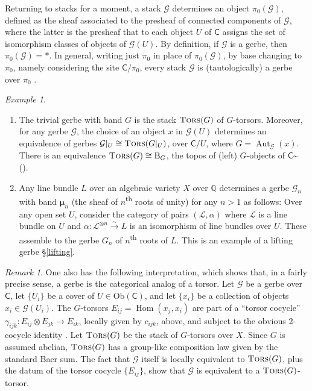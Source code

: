 \documentclass{amsart}
\numberwithin{equation}{subsection}
\theoremstyle{remark}
\newtheorem{example}[theorem]{Example}
\theoremstyle{remark}
\newtheorem*{remark*}{Remark}
\newcommand{\cG}{\mathcal{G}}
\newcommand{\cL}{\mathcal{L}}
\newcommand{\bbQ}{\mathbb{Q}}
\DeclareMathOperator{\Aut}{Aut}
\newcommand{\B}{\mathrm{B}} %
\newcommand{\C}{\mathsf{C}} %
\DeclareMathOperator{\Hom}{Hom}
\newcommand{\iso}{\cong}
\newcommand{\mmu}{\boldsymbol{\mu}} %
\newcommand{\Ob}{\mathrm{Ob}}
\newcommand{\shC}{\C\sptilde} %
\newcommand{\ts}{\textsuperscript}
\DeclareMathOperator{\tors}{\textsc{Tors}} %
\begin{document}
Returning to stacks for a moment, a stack $\cG$ determines an object $\pi_0(\cG)$, defined as the sheaf associated to the presheaf of connected components of $\cG$, where the latter is the presheaf that to each object $U$ of $\C$ assigns the set of isomorphism classes of objects of $\cG(U)$. By definition, if $\cG$ is a gerbe, then $\pi_0(\cG)=*$. In general, writing just $\pi_0$ in place of $\pi_0(\cG)$, by base changing to $\pi_0$, namely considering the site $\C/\pi_0$, every stack $\cG$ is (tautologically) a gerbe over $\pi_0$ \cite{L-MB}.

\begin{example}\hfill
  \begin{enumerate}
  \item The trivial gerbe with band $G$ is the stack $\tors(G)$ of $G$-torsors.  Moreover, for any gerbe $\cG$, the choice of an object $x$ in $\cG(U)$ determines an equivalence of gerbes $\cG\rvert_U\iso \tors (G\rvert_U)$, over $\C/U$, where $G=\Aut_\cG(x)$. There is an equivalence $\tors(G)\iso \B_G$, the topos of (left) $G$-objects of $\shC$ (\cite{Giraud}).

  \item Any line bundle $L$ over an algebraic variety $X$ over $\bbQ$ determines a gerbe $\cG_n$ with band $\mmu_n$ (the sheaf of $n$\ts{th} roots of unity) for any $n >1$ as follows: Over any open set $U$, consider the category of pairs $(\cL, \alpha)$ where $\cL$ is a line bundle on $U$ and $\alpha: \cL ^{\otimes n} \xrightarrow{\sim} L$ is an isomorphism of line bundles over $U$. These assemble to the gerbe $G_n$ of $n$\ts{th} roots of $L$. This is an example of a lifting gerbe \S \ref{lifting}.
  \end{enumerate}
\end{example}

\begin{remark*} One also has the following interpretation, which shows that, in a fairly precise sense, a gerbe is the categorical analog of a torsor. Let $\cG$ be a gerbe
  over $\C$, let $\{U_i\}$ be a cover of $U\in \Ob(\C)$, and let $\{x_i\}$ be a
  collection of objects $x_i\in \cG(U_i)$. The $G$-torsors
  $E_{ij}=\Hom(x_j,x_i)$ are part of a ``torsor cocycle'' $\gamma_{ijk}\colon
  E_{ij} \otimes E_{jk}\to E_{ik}$, locally given by $c_{ijk}$, above, and
  subject to the obvious 2-cocycle identity \cite[(5-10) on p.~201]{Brylinskib}. Let $\tors(G)$ be the stack of $G$-torsors
  over $X$. Since $G$ is assumed abelian, $\tors(G)$ has a group-like
  composition law given by the standard Baer sum. The fact that $\cG$ itself is locally equivalent to $\tors(G)$, plus the datum of the torsor cocycle $\{E_{ij}\}$, show that $\cG$ is equivalent to a $\tors(G)$-torsor.
\end{remark*}
\end{document}
